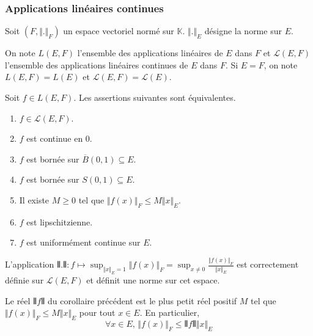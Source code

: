   \subsubsection{Applications linéaires continues}


  Soit $(F, \Vert . \Vert_F)$ un espace vectoriel normé sur $\mathbb{K}$. $\Vert . \Vert_E$ désigne la norme sur $E$.

  \begin{notation}
    On note $L(E,F)$ l'ensemble des applications linéaires de $E$ dans $F$ et $\mathcal{L}(E,F)$ l'ensemble des applications linéaires continues de $E$ dans $F$. Si $E = F$, on note $L(E,F) = L(E)$ et $\mathcal{L}(E,F) = \mathcal{L}(E)$.
  \end{notation}

  \begin{theorem}
    Soit $f \in L(E,F)$. Les assertions suivantes sont équivalentes.
    \begin{enumerate}[label={\bfseries(\roman*)}]
      \item $f \in \mathcal{L}(E,F)$.
      \item $f$ est continue en $0$.
      \item $f$ est bornée sur $\overline{B}(0,1) \subseteq E$.
      \item $f$ est bornée sur $S(0,1) \subseteq E$.
      \item Il existe $M \geq 0$ tel que $\Vert f(x) \Vert_F \leq M \Vert x \Vert_E$.
      \item $f$ est lipschitzienne.
      \item $f$ est uniformément continue sur $E$.
    \end{enumerate}
  \end{theorem}

  \begin{corollary}
    L'application $\VERT . \VERT : f \mapsto \sup_{\Vert x \Vert_E = 1} \Vert f(x) \Vert_F = \sup_{x \neq 0} \frac{\Vert f(x) \Vert_F}{\Vert x \Vert_E}$ est correctement définie sur $\mathcal{L}(E,F)$ et définit une norme sur cet espace.
  \end{corollary}

  \begin{remark}
    Le réel $\VERT f \VERT$ du corollaire précédent est le plus petit réel positif $M$ tel que $\Vert f(x) \Vert_F \leq M \Vert x \Vert_E$ pour tout $x \in E$. En particulier,
    \[ \forall x \in E, \, \Vert f(x) \Vert_F \leq \VERT f \VERT \Vert x \Vert_E \]
  \end{remark}

